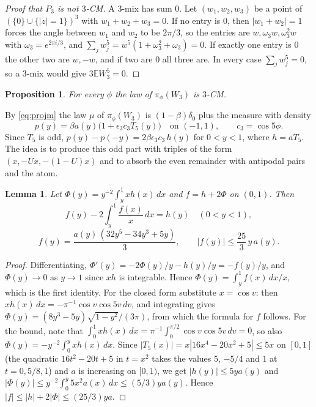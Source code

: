\documentclass[11pt]{article}
\newtheorem{lemma}[theorem]{Lemma}
\newtheorem{proposition}[theorem]{Proposition}
\theoremstyle{definition}
\theoremstyle{remark}
\newcommand{\E}{\mathbb{E}}
\begin{document}
\begin{proof}[Proof that $P_3$ is not $3$-CM]
A $3$-mix has sum $0$. Let $(w_1,w_2,w_3)$ be a point of $(\{0\}\cup\{|z|=1\})^3$ with $w_1+w_2+w_3=0$. If no entry
is $0$, then $|w_1+w_2|=1$ forces the angle between $w_1$ and $w_2$ to be $2\pi/3$, so the entries are $w,\omega_3
w,\omega_3^2w$ with $\omega_3=e^{2\pi i/3}$, and $\sum_jw_j^5=w^5(1+\omega_3^2+\omega_3)=0$. If exactly one entry is $0$ the
other two are $w,-w$, and if two are $0$ all three are. In every case $\sum_jw_j^5=0$, so a $3$-mix would give
$3\E W_3^5=0$.
\end{proof}

\begin{proposition}\label{prop:proj3}
For every $\phi$ the law of $\pi_\phi(W_3)$ is $3$-CM.
\end{proposition}

By \eqref{eq:projm} the law $\mu$ of $\pi_\phi(W_3)$ is $(1-\beta)\delta_0$ plus the measure with density
\[
p(y)=\beta a(y)\bigl(1+\epsilon_3 c_3T_5(y)\bigr)\quad\text{on }(-1,1),\qquad c_3=\cos5\phi .
\]
Since $T_5$ is odd, $p(y)-p(-y)=2\beta\epsilon_3 c_3\,h(y)$ for $0<y<1$, where $h=aT_5$. The idea is to produce this odd
part with triples of the form $(x,-Ux,-(1-U)x)$ and to absorb the even remainder with antipodal pairs and the atom.

\begin{lemma}\label{lem:ode}
Let $\Phi(y)=y^{-2}\int_y^1xh(x)\,dx$ and $f=h+2\Phi$ on $(0,1)$. Then
\[
f(y)-2\int_y^1\frac{f(x)}{x}\,dx=h(y)\quad(0<y<1),
\]
\[
f(y)=\frac{a(y)\,(32y^5-34y^3+5y)}{3},\qquad |f(y)|\le\frac{25}{3}\,y\,a(y).
\]
\end{lemma}

\begin{proof}
Differentiating, $\Phi'(y)=-2\Phi(y)/y-h(y)/y=-f(y)/y$, and $\Phi(y)\to0$ as $y\to1$ since $xh$ is integrable. Hence
$\Phi(y)=\int_y^1f(x)\,dx/x$, which is the first identity. For the closed form substitute $x=\cos v$: then
$xh(x)\,dx=-\pi^{-1}\cos v\cos5v\,dv$, and integrating gives $\Phi(y)=(8y^3-5y)\sqrt{1-y^2}/(3\pi)$, from which the
formula for $f$ follows. For the bound, note that $\int_0^1xh(x)\,dx=\pi^{-1}\int_0^{\pi/2}\cos v\cos5v\,dv=0$, so
also $\Phi(y)=-y^{-2}\int_0^yxh(x)\,dx$. Since $|T_5(x)|=x|16x^4-20x^2+5|\le5x$ on $[0,1]$ (the quadratic $16t^2-20t+5$
in $t=x^2$ takes the values $5$, $-5/4$ and $1$ at $t=0,5/8,1$) and $a$ is increasing on $[0,1)$, we get
$|h(y)|\le5ya(y)$ and $|\Phi(y)|\le y^{-2}\int_0^y5x^2a(x)\,dx\le(5/3)ya(y)$. Hence $|f|\le|h|+2|\Phi|\le(25/3)ya$.
\end{proof}
\end{document}
